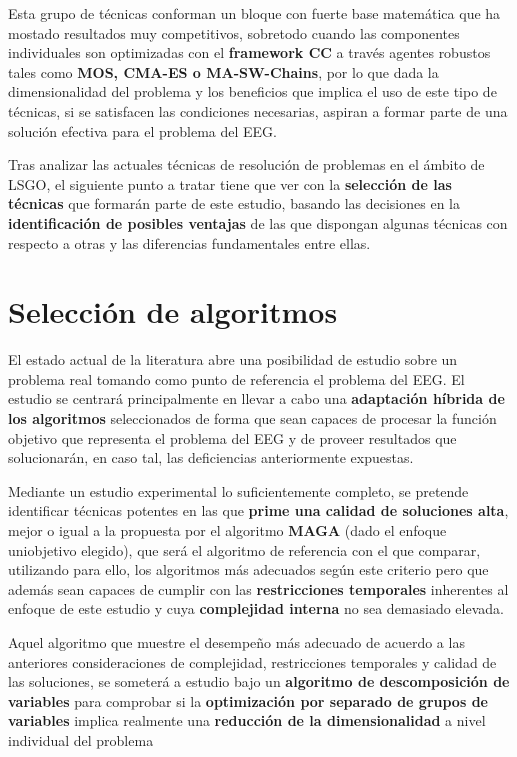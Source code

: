 Esta grupo de técnicas conforman un bloque con fuerte base matemática que ha mostado resultados muy competitivos, sobretodo cuando las componentes individuales son optimizadas con el \textbf{framework CC} a través agentes robustos tales como \textbf{MOS, CMA-ES o MA-SW-Chains}, por lo que dada la dimensionalidad del problema y los beneficios que implica el uso de este tipo de técnicas, si se satisfacen las condiciones necesarias, aspiran a formar parte de una solución efectiva para el problema del EEG.

Tras analizar las actuales técnicas de resolución de problemas en el ámbito de LSGO, el siguiente punto a tratar tiene que ver con la \textbf{selección de las técnicas} que formarán parte de este estudio, basando las decisiones en la \textbf{identificación de posibles ventajas} de las que dispongan algunas técnicas con respecto a otras y las diferencias fundamentales entre ellas.

\section{Selección de algoritmos}\label{Propuesta}

El estado actual de la literatura abre una posibilidad de estudio sobre un problema real tomando como punto de referencia el problema del EEG. El estudio se centrará principalmente en llevar a cabo una \textbf{adaptación híbrida de los algoritmos} seleccionados de forma que sean capaces de procesar la función objetivo que representa el problema del EEG y de proveer resultados que solucionarán, en caso tal, las deficiencias anteriormente expuestas.

Mediante un estudio experimental lo suficientemente completo, se pretende identificar técnicas potentes en las que \textbf{prime una calidad de soluciones alta}, mejor o igual a la propuesta por el algoritmo \textbf{MAGA} (dado el enfoque uniobjetivo elegido), que será el algoritmo de referencia con el que comparar, utilizando para ello, los algoritmos más adecuados según este criterio pero que además sean capaces de cumplir con las \textbf{restricciones temporales} inherentes al enfoque de este estudio y cuya \textbf{complejidad interna} no sea demasiado elevada.

Aquel algoritmo que muestre el desempeño más adecuado de acuerdo a las anteriores consideraciones de complejidad, restricciones temporales y calidad de las soluciones, se someterá a estudio bajo un \textbf{algoritmo de descomposición de variables} para comprobar si la \textbf{optimización por separado de grupos de variables} implica realmente una \textbf{reducción de la dimensionalidad} a nivel individual del problema

